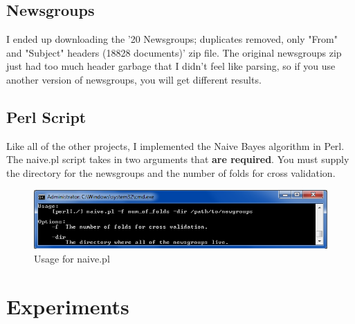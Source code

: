 \documentclass[11pt]{article}
\begin{document}
\subsection{Newsgroups}
I ended up downloading the '20 Newsgroups; duplicates removed, only "From" and "Subject" headers (18828 documents)' zip file.  The original newsgroups zip just had too much header garbage that I didn't feel like parsing, so if you use another version of newsgroups, you will get different results.
\subsection{Perl Script}
Like all of the other projects, I implemented the Naive Bayes algorithm in Perl.  The naive.pl script takes in two arguments that \textbf{are required}.  You must supply the directory for the newsgroups and the number of folds for cross validation.
\begin{figure}[h!]
\includegraphics[scale=1]{usage.png}
\caption{Usage for naive.pl}
\end{figure}
\newpage
\section{Experiments}
\end{document}
